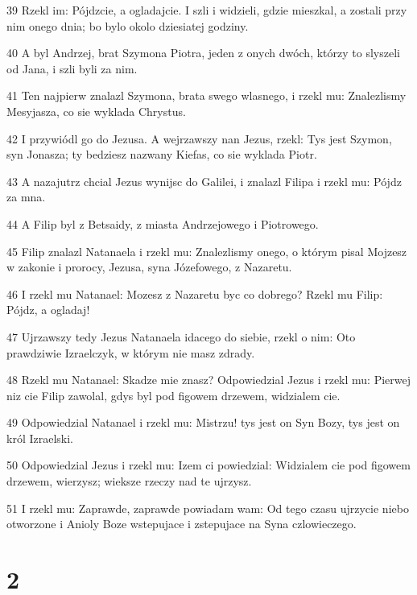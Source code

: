 \par 39 Rzekl im: Pójdzcie, a ogladajcie. I szli i widzieli, gdzie mieszkal, a zostali przy nim onego dnia; bo bylo okolo dziesiatej godziny.
\par 40 A byl Andrzej, brat Szymona Piotra, jeden z onych dwóch, którzy to slyszeli od Jana, i szli byli za nim.
\par 41 Ten najpierw znalazl Szymona, brata swego wlasnego, i rzekl mu: Znalezlismy Mesyjasza, co sie wyklada Chrystus.
\par 42 I przywiódl go do Jezusa. A wejrzawszy nan Jezus, rzekl: Tys jest Szymon, syn Jonasza; ty bedziesz nazwany Kiefas, co sie wyklada Piotr.
\par 43 A nazajutrz chcial Jezus wynijsc do Galilei, i znalazl Filipa i rzekl mu: Pójdz za mna.
\par 44 A Filip byl z Betsaidy, z miasta Andrzejowego i Piotrowego.
\par 45 Filip znalazl Natanaela i rzekl mu: Znalezlismy onego, o którym pisal Mojzesz w zakonie i prorocy, Jezusa, syna Józefowego, z Nazaretu.
\par 46 I rzekl mu Natanael: Mozesz z Nazaretu byc co dobrego? Rzekl mu Filip: Pójdz, a ogladaj!
\par 47 Ujrzawszy tedy Jezus Natanaela idacego do siebie, rzekl o nim: Oto prawdziwie Izraelczyk, w którym nie masz zdrady.
\par 48 Rzekl mu Natanael: Skadze mie znasz? Odpowiedzial Jezus i rzekl mu: Pierwej niz cie Filip zawolal, gdys byl pod figowem drzewem, widzialem cie.
\par 49 Odpowiedzial Natanael i rzekl mu: Mistrzu! tys jest on Syn Bozy, tys jest on król Izraelski.
\par 50 Odpowiedzial Jezus i rzekl mu: Izem ci powiedzial: Widzialem cie pod figowem drzewem, wierzysz; wieksze rzeczy nad te ujrzysz.
\par 51 I rzekl mu: Zaprawde, zaprawde powiadam wam: Od tego czasu ujrzycie niebo otworzone i Anioly Boze wstepujace i zstepujace na Syna czlowieczego.

\chapter{2}

